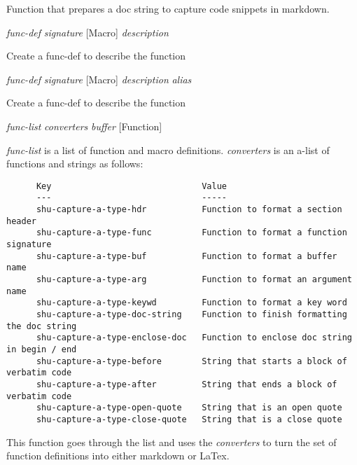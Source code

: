 \begin{doc-string}
Function that prepares a doc string to capture code snippets in markdown.
\end{doc-string}

\vspace{1em}
\noindent
{}
\usebox{\funcname}\emph{func-def} \emph{signature}
 \hfill [Macro]
\hspace*{\wd\funcname}\emph{description}

\begin{doc-string}
Create a func-def to describe the function
\end{doc-string}

\vspace{1em}
\noindent
{}
\usebox{\funcname}\emph{func-def} \emph{signature}
 \hfill [Macro]
\hspace*{\wd\funcname}\emph{description} \emph{alias}

\begin{doc-string}
Create a func-def to describe the function
\end{doc-string}

\vspace{1em}
\noindent
{}
\usebox{\funcname}\emph{func-list} \emph{converters} \emph{buffer}
 \hfill [Function]
\hspace*{\wd\funcname}

\begin{doc-string}
\emph{func-list} is a list of function and macro definitions.  \emph{converters}
is an a-list of functions and strings as
follows:

\begin{verbatim}
      Key                              Value
      ---                              -----
      shu-capture-a-type-hdr           Function to format a section header
      shu-capture-a-type-func          Function to format a function signature
      shu-capture-a-type-buf           Function to format a buffer name
      shu-capture-a-type-arg           Function to format an argument name
      shu-capture-a-type-keywd         Function to format a key word
      shu-capture-a-type-doc-string    Function to finish formatting the doc string
      shu-capture-a-type-enclose-doc   Function to enclose doc string in begin / end
      shu-capture-a-type-before        String that starts a block of verbatim code
      shu-capture-a-type-after         String that ends a block of verbatim code
      shu-capture-a-type-open-quote    String that is an open quote
      shu-capture-a-type-close-quote   String that is a close quote
\end{verbatim}

This function goes through the list and uses the \emph{converters} to turn the set of
function definitions into either markdown or LaTex.
\end{doc-string}

